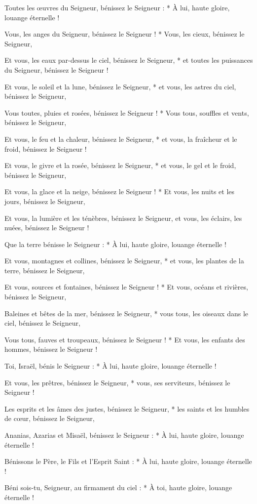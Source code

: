 \item Toutes les œuvres du Seigneur, bénissez le Seigneur : * À lui, haute gloire, louange éternelle !
\item Vous, les anges du Seigneur, bénissez le Seigneur ! * Vous, les cieux, bénissez le Seigneur,
\item Et vous, les eaux par-dessus le ciel, bénissez le Seigneur, * et toutes les puissances du Seigneur, bénissez le Seigneur !
\item Et vous, le soleil et la lune, bénissez le Seigneur, * et vous, les astres du ciel, bénissez le Seigneur,
\item Vous toutes, pluies et rosées, bénissez le Seigneur ! * Vous tous, souffles et vents, bénissez le Seigneur,
\item Et vous, le feu et la chaleur, bénissez le Seigneur, * et vous, la fraîcheur et le froid, bénissez le Seigneur !
\item Et vous, le givre et la rosée, bénissez le Seigneur, * et vous, le gel et le froid, bénissez le Seigneur,
\item Et vous, la glace et la neige, bénissez le Seigneur ! * Et vous, les nuits et les jours, bénissez le Seigneur,
\item Et vous, la lumière et les ténèbres, bénissez le Seigneur, et vous, les éclairs, les nuées, bénissez le Seigneur !
\item Que la terre bénisse le Seigneur : * À lui, haute gloire, louange éternelle !
\item Et vous, montagnes et collines, bénissez le Seigneur, * et vous, les plantes de la terre, bénissez le Seigneur,
\item Et vous, sources et fontaines, bénissez le Seigneur ! * Et vous, océans et rivières, bénissez le Seigneur,
\item Baleines et bêtes de la mer, bénissez le Seigneur, * vous tous, les oiseaux dans le ciel, bénissez le Seigneur,
\item Vous tous, fauves et troupeaux, bénissez le Seigneur ! * Et vous, les enfants des hommes, bénissez le Seigneur !
\item Toi, Israël, bénis le Seigneur : * À lui, haute gloire, louange éternelle !
\item Et vous, les prêtres, bénissez le Seigneur, * vous, ses serviteurs, bénissez le Seigneur !
\item Les esprits et les âmes des justes, bénissez le Seigneur, * les saints et les humbles de cœur, bénissez le Seigneur,
\item Ananias, Azarias et Misaël, bénissez le Seigneur : * À lui, haute gloire, louange éternelle !
\item Bénissons le Père, le Fils et l'Esprit Saint : * À lui, haute gloire, louange éternelle !
\item Béni sois-tu, Seigneur, au firmament du ciel : * À toi, haute gloire, louange éternelle !
